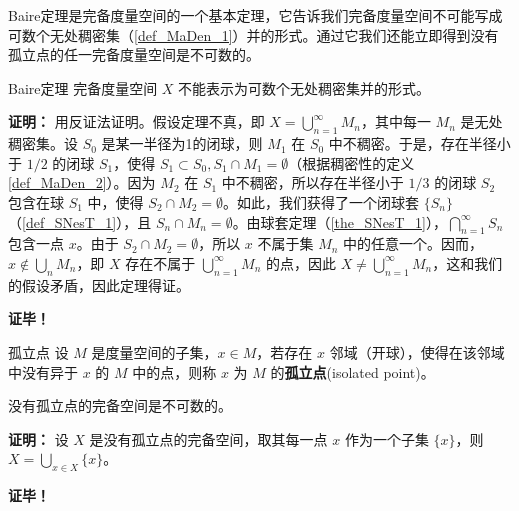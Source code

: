 
Baire定理是完备度量空间的一个基本定理，它告诉我们完备度量空间不可能写成可数个无处稠密集（\autoref{def_MaDen_1}）并的形式。通过它我们还能立即得到没有孤立点的任一完备度量空间是不可数的。

\begin{theorem}{Baire定理}
完备度量空间 $X$ 不能表示为可数个无处稠密集并的形式。
\end{theorem}
\textbf{证明：}
用反证法证明。假设定理不真，即 $X=\bigcup_{n=1}^\infty M_n$，其中每一 $M_n$ 是无处稠密集。设 $S_0$ 是某一半径为1的闭球，则 $M_1$ 在 $S_0$ 中不稠密。于是，存在半径小于 $1/2$ 的闭球 $S_1$，使得 $S_1\subset S_0,S_1\cap M_1=\emptyset$（根据稠密性的定义\autoref{def_MaDen_2}）。因为 $M_2$ 在 $S_1$ 中不稠密，所以存在半径小于 $1/3$ 的闭球 $S_2$ 包含在球 $S_1$ 中，使得 $S_2\cap M_2=\emptyset$。如此，我们获得了一个闭球套 $\{S_n\}$ （\autoref{def_SNesT_1}），且 $S_n\cap M_n=\emptyset$。由球套定理（\autoref{the_SNesT_1}），$\bigcap_{n=1}^\infty S_n$ 包含一点 $x$。由于 $S_2\cap M_2=\emptyset$，所以 $x$ 不属于集 $M_n$ 中的任意一个。因而，$x\notin \bigcup\limits_n M_n$，即 $X$ 存在不属于 $\bigcup_{n=1}^\infty M_n$ 的点，因此 $X\neq\bigcup_{n=1}^\infty M_n$，这和我们的假设矛盾，因此定理得证。

\textbf{证毕！}


\begin{definition}{孤立点}
设 $M$ 是度量空间的子集，$x\in M$，若存在 $x$ 邻域（开球），使得在该邻域中没有异于 $x$ 的 $M$ 中的点，则称 $x$ 为 $M$ 的\textbf{孤立点}(isolated point)。
\end{definition}

\begin{corollary}{}
没有孤立点的完备空间是不可数的。
\end{corollary}

\textbf{证明：}
设 $X$ 是没有孤立点的完备空间，取其每一点 $x$ 作为一个子集 $\{x\}$，则 $X=\bigcup\limits_{x\in X}\{x\}$。

\textbf{证毕！}



